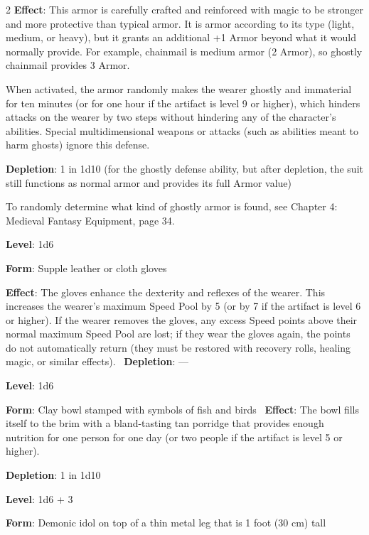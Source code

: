 \begin{multicols}{2}
\textbf{Effect}: This armor is carefully crafted and reinforced with magic to be stronger and more protective than typical armor. It is armor according to its type (light, medium, or heavy), but it grants an additional +1 Armor beyond what it would normally provide. For example, chainmail is medium armor (2 Armor), so ghostly chainmail provides 3 Armor. 

When activated, the armor randomly makes the wearer ghostly and immaterial for ten minutes (or for one hour if the artifact is level 9 or higher), which hinders attacks on the wearer by two steps without hindering any of the character’s abilities. Special multidimensional weapons or attacks (such as abilities meant to harm ghosts) ignore this defense. 

\textbf{Depletion}: 1 in 1d10 (for the ghostly defense ability, but after depletion, the suit still functions as normal armor and provides its full Armor value)

To randomly determine what kind of ghostly armor is found, see Chapter 4: Medieval Fantasy Equipment, page 34. 


\textbf{Level}: 1d6 

\textbf{Form}: Supple leather or cloth gloves 

\textbf{Effect}: The gloves enhance the dexterity and reflexes of the wearer. This increases the wearer’s maximum Speed Pool by 5 (or by 7 if the artifact is level 6 or higher). If the wearer removes the gloves, any excess Speed points above their normal maximum Speed Pool are lost; if they wear the gloves again, the points do not automatically return (they must be restored with recovery rolls, healing magic, or similar effects). 
\textbf{Depletion}: — 


\textbf{Level}: 1d6 

\textbf{Form}: Clay bowl stamped with symbols of fish and birds 
\textbf{Effect}: The bowl fills itself to the brim with a bland-tasting tan porridge that provides enough nutrition for one person for one day (or two people if the artifact is level 5 or higher). 

\textbf{Depletion}: 1 in 1d10 


\textbf{Level}: 1d6 + 3 

\textbf{Form}: Demonic idol on top of a thin metal leg that is 1 foot (30 cm) tall 


\end{multicols}
